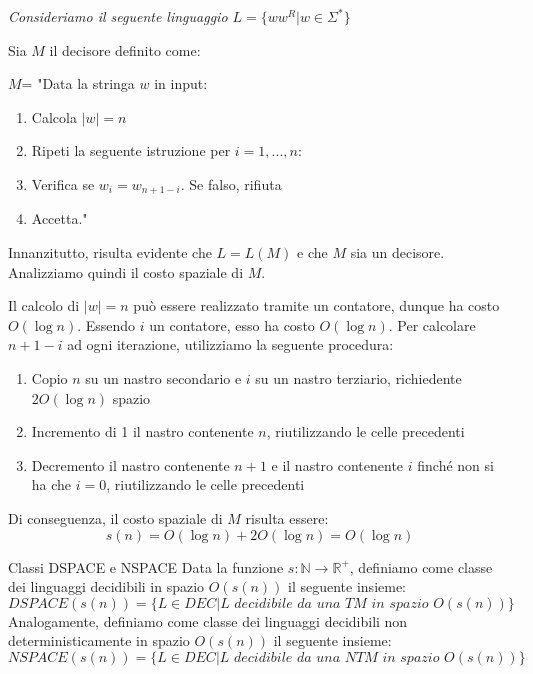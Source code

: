 \begin{Example}{}{}
\textit{Consideriamo il seguente linguaggio $L = \{ww^R | w\in \Sigma^*\}$}

Sia $M$ il decisore definito come:

$M $= "Data la stringa $w$ in input:
\begin{enumerate}
    \item Calcola $|w| = n$
    \item Ripeti la seguente istruzione per $i = 1, . . . , n$:
    \item Verifica se $w_i = w_{n+1-i}$. Se falso, rifiuta
    \item Accetta."
\end{enumerate}
Innanzitutto, risulta evidente che $L = L(M)$ e che $M$ sia un decisore. Analizziamo quindi il costo spaziale di $M$.

Il calcolo di $|w| = n$ può essere realizzato tramite un contatore, dunque ha costo $O(\log n)$. Essendo $i$ un contatore, esso ha costo $O(\log n)$. Per calcolare $n + 1 - i$ ad ogni iterazione, utilizziamo la seguente procedura: 
\begin{enumerate}
    \item Copio $n$ su un nastro secondario e $i$ su un nastro terziario, richiedente $2O(\log n)$ spazio
    \item Incremento di 1 il nastro contenente $n$, riutilizzando le celle precedenti
    \item Decremento il nastro contenente $n + 1$ e il nastro contenente $i$ finché non si ha che $i = 0$, riutilizzando le celle precedenti
\end{enumerate}
Di conseguenza, il costo spaziale di $M$ risulta essere:
\begin{equation*}
    s(n) = O(\log n) + 2O(\log n) = O(\log n)
\end{equation*}
\end{Example}

\begin{Definition}{Classi DSPACE e NSPACE}{}
Data la funzione $s :\mathbb{N}\to \mathbb{R}^+$, definiamo come classe dei linguaggi decidibili in spazio $O(s(n))$ il seguente insieme:
\begin{equation*}
    DSPACE(s(n)) = \{L\in DEC | L\textit{ decidibile da una TM in spazio }O(s(n))\}
\end{equation*}
Analogamente, definiamo come classe dei linguaggi decidibili non deterministicamente in spazio $O(s(n))$ il seguente insieme:
\begin{equation*}
    NSPACE(s(n)) = \{L\in DEC | L\textit{ decidibile da una NTM in spazio }O(s(n))\}
\end{equation*}
\end{Definition}

